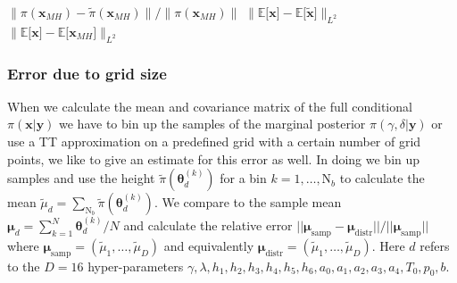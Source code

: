 $\lVert \pi(\bm{x}_{MH}) - \tilde{\pi}(\bm{x}_{MH}) \rVert / \lVert \pi(\bm{x}_{MH}) \rVert$
$\lVert \mathbb{E}\big[ \bm{x} \big]  -  \mathbb{E} \big[ \tilde{\bm{x}} \big] \rVert_{L^2}$
$\lVert \mathbb{E}  \big[\bm{x}\big] -  \mathbb{E} \big[ \bm{x}_{MH}\big]  \rVert_{L^2}$
\subsubsection{Error due to grid size}
When we calculate the mean and covariance matrix of the full conditional $\pi(\bm{x}|\bm{y})$ we have to bin up the samples of the marginal posterior $\pi(\gamma, \delta |\bm{y})$ or use a TT approximation on a predefined grid with a certain number of grid points, we like to give an estimate for this error as well.
In doing we bin up samples and use the height $\tilde{\pi}(\bm{\theta}^{(k)}_d)$ for a bin $k = 1, \dots, \text{N}_b$ to calculate the mean $\tilde{\mu}_d = \sum_{\text{N}_b} \tilde{\pi}(\bm{\theta}^{(k)}_d) $.
We compare to the sample mean $\bm{\mu}_d = \sum_{k=1}^N \bm{\theta}^{(k)}_d/N$ and calculate the relative error $||\bm{\mu}_{\text{samp}} -\bm{\mu}_{\text{distr}} ||/ || \bm{\mu}_{\text{samp}} ||$
where $\bm{\mu}_{\text{samp}} =(\tilde{\mu}_1, \dots , \tilde{\mu}_D) $ and equivalently $\bm{\mu}_{\text{distr}} =(\tilde{\mu}_1, \dots , \tilde{\mu}_D) $.
Here $d$ refers to the $D = 16$ hyper-parameters $\gamma, \lambda, h_1, h_2, h_3, h_4, h_5, h_6, a_0, a_1, a_2, a_3, a_4, T_0, p_0, b$.

